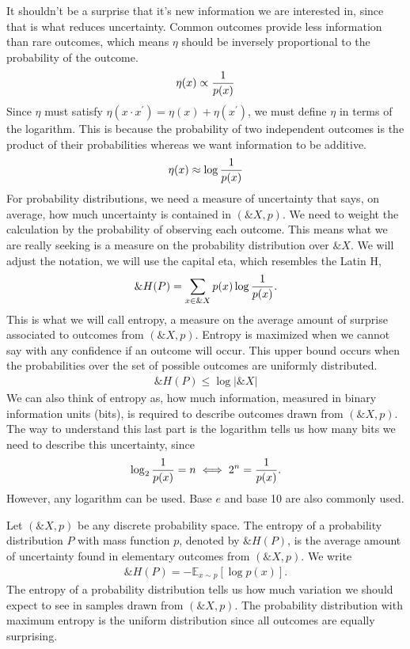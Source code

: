 It shouldn't be a surprise that it's new information we are interested
in, since that is what reduces uncertainty. Common outcomes provide
less information than rare outcomes, which means $\eta$ should be
inversely proportional to the probability of the outcome.
\begin{align}
  \label{eq:eta-1}
  \eta(x) \propto {1 \over p(x)}
\end{align}
Since $\eta$ must satisfy
$\eta(x \cdot x^\prime) = \eta(x) + \eta(x^\prime)$, we must define
$\eta$ in terms of the logarithm.  This is because the probability of
two independent outcomes is the product of their probabilities whereas
we want information to be additive.
\begin{align}
  \label{eq:eta-3}
  \eta(x) \approx \log{1 \over p(x)}
\end{align}
For probability distributions, we need a measure of uncertainty that
says, on average, how much uncertainty is contained in $(\&X, p)$. We
need to weight the calculation by the probability of observing each
outcome. This means what we are really seeking is a measure on the
probability distribution over $\&X$. We will adjust the notation, we
will use the capital eta, which resembles the Latin H,
\begin{align}
  \label{eq:eta-almost}
  \&H(P) = \sum_{x \in \&X} p(x) \log{1 \over p(x)}.
\end{align}
This is what we will call entropy, a measure on the average amount of
surprise associated to outcomes from $(\&X, p)$.  Entropy is maximized
when we cannot say with any confidence if an outcome will occur. This
upper bound occurs when the probabilities over the set of possible
outcomes are uniformly distributed.
\begin{align}
  \label{eq:eta-2}
  \&H(P) \leq \log{|\&X|}
\end{align}
We can also think of entropy as, how much information, measured in
binary information units (bits), is required to describe outcomes
drawn from $(\&X, p)$. The way to understand this last part is the
logarithm tells us how many bits we need to describe this uncertainty,
since
\begin{align}
  \label{eq:understand-log}
  \log_2{1 \over p(x)} = n \iff 2^n = {1 \over p(x)}.
\end{align}
However, any logarithm can be used. Base $e$ and base 10 are also
commonly used.
\begin{definition}
  Let $(\&X, p)$ be any discrete probability space. The
  \textnormal{\sffamily entropy} of a probability distribution $P$
  with mass function $p$, denoted by $\&H(P)$, is the average amount
  of uncertainty found in elementary outcomes from $(\&X, p)$. We
  write
  \begin{align}
    \label{eq:entropy}
    \&H(P) = - \mathbb{E}_{x \sim p} \left[ \log{p(x)} \right].
  \end{align}
  The entropy of a probability distribution tells us how much
  variation we should expect to see in samples drawn from $(\&X,
  p)$. The probability distribution with maximum entropy is the
  uniform distribution since all outcomes are equally surprising.
\end{definition}

